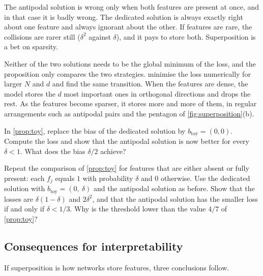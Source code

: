 \begin{intuition}
The antipodal solution is wrong only when both features are present at once, and in that case it is badly
wrong. The dedicated solution is always exactly right about one feature and always ignorant about the other.
If features are rare, the collisions are rarer still ($\delta^2$ against $\delta$), and it pays to store both.
Superposition is a bet on sparsity.
\end{intuition}

Neither of the two solutions needs to be the global minimum of the loss, and the proposition only compares the
two strategies. \citet{elhage2022toy} minimise the loss numerically for larger $N$ and $d$ and find the same
transition. When the features are dense, the model stores the $d$ most important ones in orthogonal directions
and drops the rest. As the features become sparser, it stores more and more of them, in regular arrangements
such as antipodal pairs and the pentagon of \cref{fig:superposition}(b).

\begin{exercise}\label{ex:nobias}
In \cref{prop:toy}, replace the bias of the dedicated solution by $b_{\mathrm{toy}}=(0,0)$. Compute the loss and
show that the antipodal solution is now better for every $\delta<1$. What does the bias $\delta/2$ achieve?
\end{exercise}

\begin{exercise}\label{ex:binaryfeat}
Repeat the comparison of \cref{prop:toy} for features that are either absent or fully present: each $f_j$ equals
$1$ with probability $\delta$ and $0$ otherwise. Use the dedicated solution with $b_{\mathrm{toy}}=(0,\ \delta)$ and
the antipodal solution as before. Show that the losses are $\delta(1-\delta)$ and $2\delta^2$, and that the
antipodal solution has the smaller loss if and only if $\delta<1/3$. Why is the threshold lower than the value
$4/7$ of \cref{prop:toy}?
\end{exercise}

\subsection{Consequences for interpretability}

If superposition is how networks store features, three conclusions follow.

